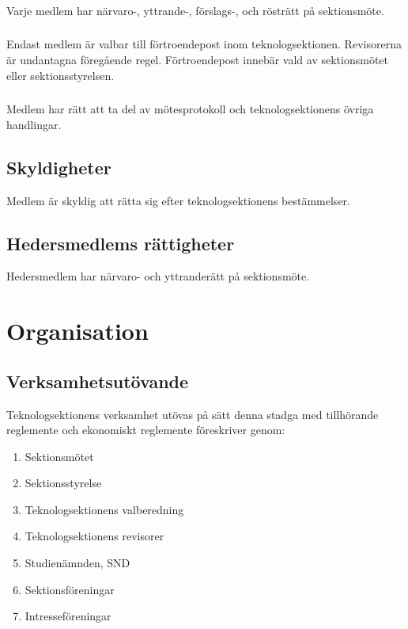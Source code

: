 \documentclass[a4paper, 10pt]{article}
\begin{document}
\subsubsection{}
Varje medlem har närvaro-, yttrande-, förslags-, och rösträtt på sektionsmöte.
\subsubsection{}
Endast medlem är valbar till förtroendepost inom teknologsektionen. Revisorerna är undantagna föregående regel. Förtroendepost innebär vald av sektionsmötet eller sektionsstyrelsen.
\subsubsection{}
Medlem har rätt att ta del av mötesprotokoll och teknologsektionens övriga handlingar.
\subsection{Skyldigheter}
Medlem är skyldig att rätta sig efter teknologsektionens bestämmelser.
\subsection{Hedersmedlems rättigheter}
Hedersmedlem har närvaro- och yttranderätt på sektionsmöte.
\newpage

\section{Organisation}
\subsection{Verksamhetsutövande}
Teknologsektionens verksamhet utövas på sätt denna stadga med tillhörande reglemente och ekonomiskt reglemente föreskriver genom:
\begin{enumerate}
\item Sektionsmötet
\item Sektionsstyrelse
\item Teknologsektionens valberedning
\item Teknologsektionens revisorer
\item Studienämnden, SND
\item Sektionsföreningar
\item Intresseföreningar
\end{enumerate}
\end{document}
